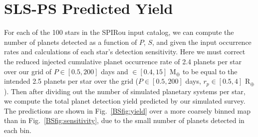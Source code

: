 \section{SLS-PS Predicted Yield} \label{BSsect:yield}
For each of the 100 stars in the SPIRou input catalog,
we can compute the number of planets detected as a function of $P$, $S$,
and \msini{} given the input occurrence rates and calculations of each star's detection sensitivity.
Here we must correct the reduced injected cumulative planet occurrence rate of 2.4 planets per star
over our grid of $P \in [0.5,200]$ days and \msini{} $\in [0.4,15]$ M$_{\oplus}$ to be equal to the
intended 2.5 planets per star over the \cite{dressing15a} grid ($P \in [0.5,200]$ days, $r_p \in [0.5,4]$
R$_{\oplus}$). Then after dividing out the number of simulated planetary systems per star,
we compute the total planet detection yield predicted by our
simulated survey. The predictions are shown in Fig.~\ref{BSfig:yield} over a more coarsely
binned map than in Fig.~\ref{BSfig:sensitivity}, due to the small number of planets detected in each
bin. \\

